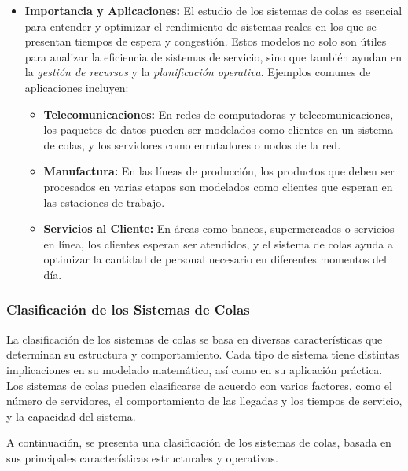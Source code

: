 \documentclass{article}
\begin{document}
\begin{itemize}
    \item \textbf{Importancia y Aplicaciones:} El estudio de los sistemas de colas es esencial para entender y optimizar el rendimiento de sistemas reales en los que se presentan tiempos de espera y congestión. Estos modelos no solo son útiles para analizar la eficiencia de sistemas de servicio, sino que también ayudan en la \textit{gestión de recursos} y la \textit{planificación operativa}. Ejemplos comunes de aplicaciones incluyen:
    \begin{itemize}
        \item \textbf{Telecomunicaciones:} En redes de computadoras y telecomunicaciones, los paquetes de datos pueden ser modelados como clientes en un sistema de colas, y los servidores como enrutadores o nodos de la red.
        \item \textbf{Manufactura:} En las líneas de producción, los productos que deben ser procesados en varias etapas son modelados como clientes que esperan en las estaciones de trabajo.
        \item \textbf{Servicios al Cliente:} En áreas como bancos, supermercados o servicios en línea, los clientes esperan ser atendidos, y el sistema de colas ayuda a optimizar la cantidad de personal necesario en diferentes momentos del día.
    \end{itemize}
\end{itemize}

\subsubsection{Clasificación de los Sistemas de Colas}
La clasificación de los sistemas de colas se basa en diversas características que determinan su estructura y comportamiento. Cada tipo de sistema tiene distintas implicaciones en su modelado matemático, así como en su aplicación práctica. Los sistemas de colas pueden clasificarse de acuerdo con varios factores, como el número de servidores, el comportamiento de las llegadas y los tiempos de servicio, y la capacidad del sistema.

A continuación, se presenta una clasificación de los sistemas de colas, basada en sus principales características estructurales y operativas.
\end{document}
